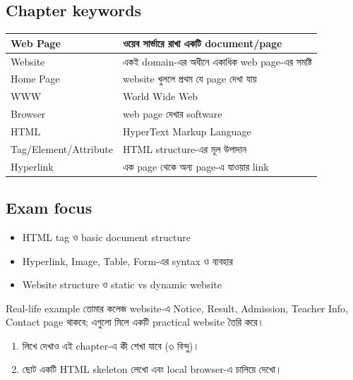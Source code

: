 \subsection{Chapter keywords}
\begin{center}
\begin{tabular}{|p{}|p{}|}
\hline
Web Page & ওয়েব সার্ভারে রাখা একটি document/page \\
\hline
Website & একই domain-এর অধীনে একাধিক web page-এর সমষ্টি \\
\hline
Home Page & website খুললে প্রথম যে page দেখা যায় \\
\hline
WWW & World Wide Web \\
\hline
Browser & web page দেখার software \\
\hline
HTML & HyperText Markup Language \\
\hline
Tag/Element/Attribute & HTML structure-এর মূল উপাদান \\
\hline
Hyperlink & এক page থেকে অন্য page-এ যাওয়ার link \\
\hline
\end{tabular}
\end{center}

\subsection{Exam focus}
\begin{itemize}
\item HTML tag ও basic document structure
\item Hyperlink, Image, Table, Form-এর syntax ও ব্যবহার
\item Website structure ও static vs dynamic website
\end{itemize}

\begin{examplebox}{Real-life example}
তোমার কলেজ website-এ Notice, Result, Admission, Teacher Info, Contact page থাকবে; এগুলো মিলে একটি practical website তৈরি করে।
\end{examplebox}

\begin{practicebox}
\begin{enumerate}
\item লিখে দেখাও এই chapter-এ কী শেখা যাবে (৩ বিন্দু)।
\item ছোট একটি HTML skeleton লেখো এবং local browser-এ চালিয়ে দেখো।
\end{enumerate}
\end{practicebox}
